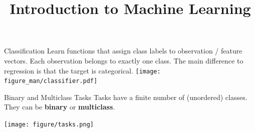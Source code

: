 \documentclass[11pt,compress,t,notes=noshow, xcolor=table]{beamer}
\title{Introduction to Machine Learning}
\begin{document}

\begin{vbframe}{Classification}
Learn functions that assign class labels to observation / feature vectors. Each observation belongs to exactly one class. The main difference to regression is that the target is categorical.
{\centering \texttt{[image: figure\_man/classifier.pdf]}}

\end{vbframe}

\begin{vbframe}{Binary and Multiclass Tasks}
Tasks have a finite number of (unordered) classes. \\
They can be \textbf{binary} or \textbf{multiclass}.

\vspace{1em}

\begin{center}
\texttt{[image: figure/tasks.png]}
\end{center}


\end{vbframe}
\end{document}
